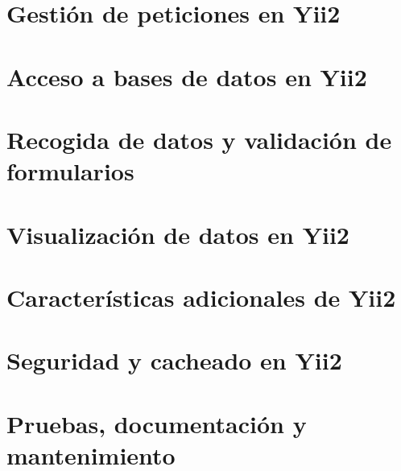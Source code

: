 \documentclass[a4paper,11pt,spanish]{sphinxmanual}
\begin{document}
\part{Gestión de peticiones en Yii2}
\label{\detokenize{gestion-de-peticiones-en-yii2:gestion-de-peticiones-en-yii2}}\label{\detokenize{gestion-de-peticiones-en-yii2::doc}}

\part{Acceso a bases de datos en Yii2}
\label{\detokenize{acceso-a-bases-de-datos-en-yii2:acceso-a-bases-de-datos-en-yii2}}\label{\detokenize{acceso-a-bases-de-datos-en-yii2::doc}}

\part{Recogida de datos y validación de formularios}
\label{\detokenize{recogida-de-datos-y-validacion-de-formularios-en-yii2::doc}}\label{\detokenize{recogida-de-datos-y-validacion-de-formularios-en-yii2:recogida-de-datos-y-validacion-de-formularios}}

\part{Visualización de datos en Yii2}
\label{\detokenize{visualizacion-de-datos-en-yii2:visualizacion-de-datos-en-yii2}}\label{\detokenize{visualizacion-de-datos-en-yii2::doc}}

\part{Características adicionales de Yii2}
\label{\detokenize{caracteristicas-adicionales-de-yii2:caracteristicas-adicionales-de-yii2}}\label{\detokenize{caracteristicas-adicionales-de-yii2::doc}}

\part{Seguridad y cacheado en Yii2}
\label{\detokenize{seguridad-y-cacheado-en-yii2:seguridad-y-cacheado-en-yii2}}\label{\detokenize{seguridad-y-cacheado-en-yii2::doc}}

\part{Pruebas, documentación y mantenimiento}
\label{\detokenize{pruebas-documentacion-y-mantenimiento:pruebas-documentacion-y-mantenimiento}}\label{\detokenize{pruebas-documentacion-y-mantenimiento::doc}}
\end{document}
